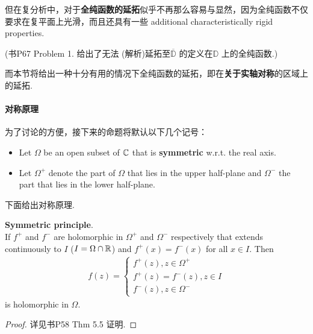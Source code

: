 但在复分析中，对于\textbf{全纯函数的延拓}似乎不再那么容易与显然，因为全纯函数不仅要求在复平面上光滑，而且还具有一些 additional characteristically rigid properties. 
\begin{center}
	(书P67 Problem 1. 给出了无法 (解析)延拓至$\overline{\mathbb{D}}$ 的定义在$\mathbb{D}$ 上的全纯函数.)
\end{center}
而本节将给出一种十分有用的情况下全纯函数的延拓，即在\textbf{关于实轴对称}的区域上的延拓.

\vspace{2em}
\paragraph{对称原理}
为了讨论的方便，接下来的命题将默认以下几个记号：
\begin{itemize}
	\item Let $\Omega$ be an open subset of $\mathbb{C}$ that is \textbf{symmetric} w.r.t. the real axis.
	
	\item Let $\Omega^{+}$ denote the part of $\Omega$ that lies in the upper half-plane and $\Omega^{-}$ the part that lies in the lower half-plane.
\end{itemize}

\vspace{2em}
下面给出对称原理.
\begin{thm}\label{thm 6.4.1}
	\textbf{Symmetric principle}. \\
	If $f^{+}$ and $f^{-}$ are holomorphic in $\Omega^{+}$ and $\Omega^{-}$ respectively that extends continuously to $I$ ($I = \Omega \cap \mathbb{R}$) and $f^{+}(x) = f^{-}(x)$ for all $x \in I$. Then
	\begin{align}
		f(z) = 
		\begin{cases}
			f^{+}(z) , z \in \Omega^{+} \\
			f^{+}(z) = f^{-}(z) , z \in I \\
			f^{-}(z) , z \in \Omega^{-}
		\end{cases}
	\end{align}
	is holomorphic in $\Omega$.
	
	\vspace{2em}
	\begin{proof}
		详见书P58 Thm 5.5 证明.
	\end{proof}
\end{thm}

\newpage
